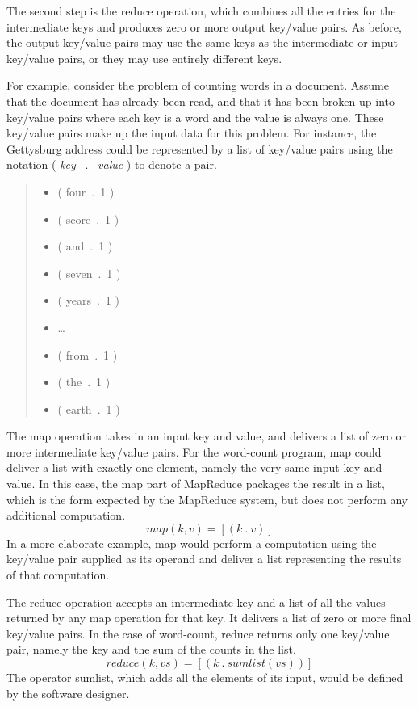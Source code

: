 The second step is the \textsf{reduce}
operation, which combines all the entries
for the intermediate keys and
produces zero or more output key/value pairs.  As before, the
output key/value pairs may use the same keys as the
intermediate or input key/value pairs, or they may use
entirely different keys.

For example, consider the problem of counting words in a
document.  Assume that the document has already been
read, and that it has been broken up into key/value pairs
where each key is a word and the value is always one. These
key/value pairs make up the input data for this problem. For
instance, the Gettysburg address could be represented by a
list of key/value pairs using the notation ( \emph{key} ~.~ \emph{value} )
to denote a pair.
\begin{quote}
\begin{itemize}
\item \textsf{( four~.~1 )}
\item \textsf{( score~.~1 )}
\item \textsf{( and~.~1 )}
\item \textsf{( seven~.~1 )}
\item \textsf{( years~.~1 )}
\item \dots
\item \textsf{( from~.~1 )}
\item \textsf{( the~.~1 )}
\item \textsf{( earth~.~1 )}
\end{itemize}
\end{quote}

The map operation takes in an input key and
value, and delivers a list of zero or more intermediate
key/value pairs.  For the word-count program, map could
deliver a list with exactly one element, namely
the very same input key and value.
In this case, the map part of MapReduce
packages the result in a list, which is
the form expected by the MapReduce system,
but does not perform any additional computation.
\begin{displaymath}
map(k, v) = [ ( k ~.~ v ) ]
\end{displaymath}
In a more elaborate example, map would perform
a computation using the key/value pair supplied as
its operand and deliver a list representing the results
of that computation.

The reduce operation accepts an intermediate key and a list of
all the values returned by any map operation for that key.
It delivers a list of zero or more final key/value pairs.
In the case of word-count, reduce returns only one key/value pair,
namely the key and the sum of the counts in the list.
\begin{displaymath}
reduce(k, vs) = [ ( k ~.~ sumlist(vs) ) ]
\end{displaymath}
The operator sumlist, which adds all the elements of its
input, would be defined by the software designer.


